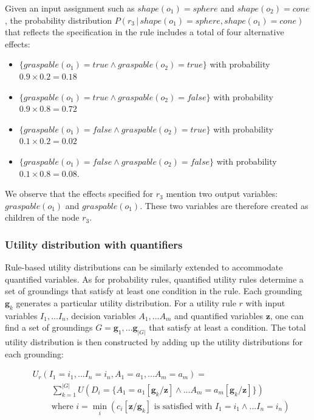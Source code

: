 Given an input assignment such as $shape(o_1) = \mathit{sphere}$ and $shape(o_2) = \mathit{cone}$, the probability distribution $P(r_3 \, | \, \mathit{shape}(o_1)\!=\!\mathit{sphere}, \mathit{shape}(o_1)\!=\!\mathit{cone})$ that reflects the specification in the rule includes a total of four alternative effects: \begin{itemize}
\item $\{\mathit{graspable}(o_1)\!=\!true \land \mathit{graspable}(o_2)\!=\!true \} $ with probability $0.9 \times 0.2 = 0.18$ 
\item $\{\mathit{graspable}(o_1)\!=\!true \land \mathit{graspable}(o_2)\!=\!false\}$ with probability $0.9 \times 0.8 = 0.72$ 
\item $\{\mathit{graspable}(o_1)\!=\!false \land \mathit{graspable}(o_2)\!=\!true \}$ with probability $0.1 \times 0.2 = 0.02$ 
\item $\{\mathit{graspable}(o_1)\!=\!false \land \mathit{graspable}(o_2)\!=\!false\}$ with probability $0.1 \times 0.8 = 0.08$. 
\end{itemize}

We observe that the effects specified for $r_3$ mention two output variables: $\mathit{graspable}(o_1)$ and $\mathit{graspable}(o_1)$.  These two variables are therefore created as children of the node $r_3$. 

\subsubsection*{Utility distribution with quantifiers}

Rule-based utility distributions can be similarly extended to accommodate quantified variables. As for probability rules, quantified utility rules determine a set of groundings that satisfy at least one condition in the rule.  Each grounding $\mathbf{g}_k$ generates a particular utility distribution.  For a utility rule $r$ with input variables $I_1,...I_n$, decision variables $A_1,...A_m$ and quantified variables $\mathbf{z}$, one can find a set of groundings $G= \mathbf{g}_1,...\mathbf{g}_{|G|}$ that satisfy at least a condition. The total utility distribution is then constructed by adding up the utility distributions for each grounding:

\begin{align}
& U_{r}(I_1\!=\!i_1,... I_n\!=\!i_n, A_1\!=\!a_1,... A_m\!=\!a_m) = \nonumber \\ 
&  \; \; \; \; \; \; \; \;  \sum_{k=1}^{|G|} U(D_i = \{A_1\!=\!a_1[\mathbf{g}_k / \mathbf{z}] \land... A_m\!=\!a_m[\mathbf{g}_k / \mathbf{z}]\}) \label{eq:quantifruledistrib}
 \\
& \; \; \; \; \; \; \; \; \text{where } i = \min_i (c_i[\mathbf{z} / \mathbf{g}_k]\text{ is satisfied with } I_1\!=\!i_1 \land ... I_n\!=\!i_n) \nonumber
\end{align}

